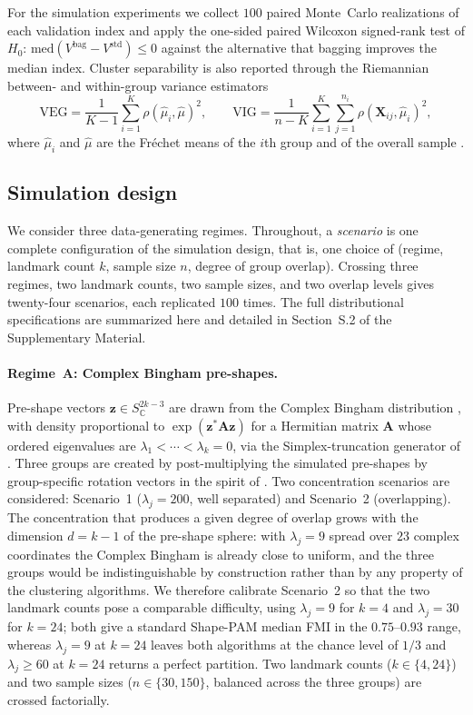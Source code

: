 \documentclass[review,11pt,3p,authoryear]{elsarticle}
\newcommand{\C}{\mathbb{C}}
\newcommand{\Herm}[1]{{#1}^{*}}
\newcommand{\preshape}{S^{2k-3}_{\C}}
\newcommand{\bz}{\mathbf{z}}
\newcommand{\bA}{\mathbf{A}}
\newcommand{\bX}{\mathbf{X}}
\newcommand{\rmVEG}{\mathrm{VEG}}
\newcommand{\rmVIG}{\mathrm{VIG}}
\begin{document}
For the simulation experiments we collect $100$ paired Monte~Carlo
realizations of each validation index and apply the one-sided paired
Wilcoxon signed-rank test \citep{wilcoxon1992individual} of
$H_0\!:\,\mathrm{med}(V^{\text{bag}}-V^{\text{std}})\le 0$ against the
alternative that bagging improves the median index. Cluster
separability is also reported through the Riemannian between- and
within-group variance estimators
\begin{equation}
  \rmVEG = \frac{1}{K-1}\sum_{i=1}^K \rho(\hat\mu_i,\hat\mu)^2,
  \qquad
  \rmVIG = \frac{1}{n-K}\sum_{i=1}^K\sum_{j=1}^{n_i}
           \rho(\bX_{ij},\hat\mu_i)^2,
  \label{eq:veg-vig}
\end{equation}
where $\hat\mu_i$ and $\hat\mu$ are the Fr\'{e}chet means of the $i$th
group and of the overall sample \citep{halkidi2002clustering,
johnson2002applied}.

\subsection{Simulation design}
\label{subsec:sim-design}

We consider three data-generating regimes. Throughout, a \emph{scenario}
is one complete configuration of the simulation design, that is, one choice of
(regime, landmark count $k$, sample size $n$, degree of group overlap). Crossing
three regimes, two landmark counts, two sample sizes, and two overlap levels
gives twenty-four scenarios, each replicated $100$ times. The full
distributional specifications are summarized here and detailed in Section~S.2 of
the Supplementary Material.

\paragraph{Regime~A: Complex Bingham pre-shapes.}
Pre-shape vectors $\bz\in\preshape$ are drawn from the Complex Bingham
distribution \citep{kent1994complex}, with density proportional to
$\exp(\Herm{\bz}\bA\bz)$ for a Hermitian matrix $\bA$ whose ordered
eigenvalues are $\lambda_1<\cdots<\lambda_k=0$, via the Simplex-truncation
generator of \citet{kent2004simulation}. Three groups are created by
post-multiplying the simulated pre-shapes by group-specific rotation
vectors in the spirit of \citet{amaral2007pivotal}. Two concentration
scenarios are considered: Scenario~1 ($\lambda_j=200$, well separated)
and Scenario~2 (overlapping). The concentration that produces a given
degree of overlap grows with the dimension $d=k-1$ of the pre-shape
sphere: with $\lambda_j=9$ spread over $23$ complex coordinates the
Complex Bingham is already close to uniform, and the three groups would
be indistinguishable by construction rather than by any property of the
clustering algorithms. We therefore calibrate Scenario~2 so that the two
landmark counts pose a comparable difficulty, using $\lambda_j=9$ for
$k=4$ and $\lambda_j=30$ for $k=24$; both give a standard Shape-PAM
median FMI in the $0.75$--$0.93$ range, whereas $\lambda_j=9$ at $k=24$
leaves both algorithms at the chance level of $1/3$ and $\lambda_j\ge 60$
at $k=24$ returns a perfect partition. Two landmark counts
($k\in\{4,24\}$) and two sample sizes ($n\in\{30,150\}$, balanced
across the three groups) are crossed factorially.
\end{document}

